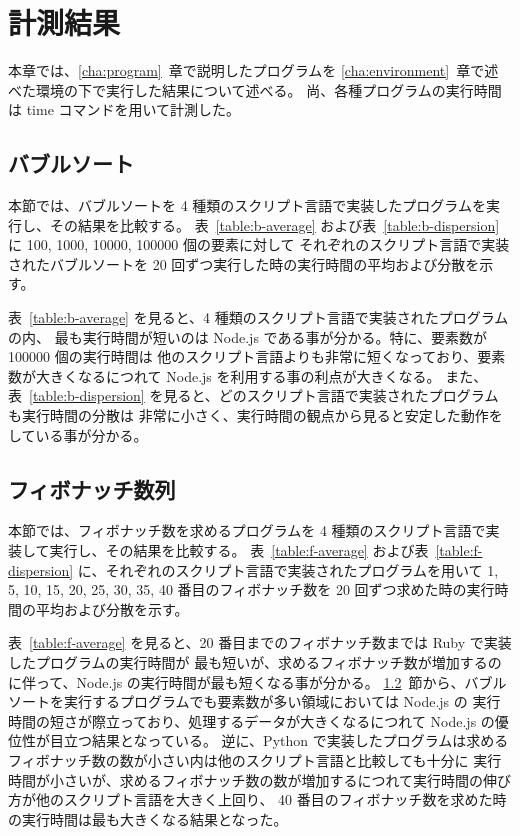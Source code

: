 \chapter{計測結果}
\label{cha:result}

本章では、\ref{cha:program}~章で説明したプログラムを \ref{cha:environment}~章で述べた環境の下で実行した結果について述べる。
尚、各種プログラムの実行時間は time コマンドを用いて計測した。

\section{バブルソート}
\label{cha:result:bubble}

本節では、バブルソートを 4 種類のスクリプト言語で実装したプログラムを実行し、その結果を比較する。
表~\ref{table:b-average} および表~\ref{table:b-dispersion} に 100, 1000, 10000, 100000 個の要素に対して
それぞれのスクリプト言語で実装されたバブルソートを 20 回ずつ実行した時の実行時間の平均および分散を示す。

表~\ref{table:b-average} を見ると、4 種類のスクリプト言語で実装されたプログラムの内、
最も実行時間が短いのは Node.js である事が分かる。特に、要素数が 100000 個の実行時間は
他のスクリプト言語よりも非常に短くなっており、要素数が大きくなるにつれて Node.js を利用する事の利点が大きくなる。
また、表~\ref{table:b-dispersion} を見ると、どのスクリプト言語で実装されたプログラムも実行時間の分散は
非常に小さく、実行時間の観点から見ると安定した動作をしている事が分かる。

\section{フィボナッチ数列}
\label{cha:result:fibonacci}

本節では、フィボナッチ数を求めるプログラムを 4 種類のスクリプト言語で実装して実行し、その結果を比較する。
表~\ref{table:f-average} および表~\ref{table:f-dispersion} に、それぞれのスクリプト言語で実装されたプログラムを用いて
1, 5, 10, 15, 20, 25, 30, 35, 40 番目のフィボナッチ数を 20 回ずつ求めた時の実行時間の平均および分散を示す。

表~\ref{table:f-average} を見ると、20 番目までのフィボナッチ数までは Ruby で実装したプログラムの実行時間が
最も短いが、求めるフィボナッチ数が増加するのに伴って、Node.js の実行時間が最も短くなる事が分かる。
\ref{cha:result:fibonacci}~節から、バブルソートを実行するプログラムでも要素数が多い領域においては Node.js の
実行時間の短さが際立っており、処理するデータが大きくなるにつれて Node.js の優位性が目立つ結果となっている。
逆に、Python で実装したプログラムは求めるフィボナッチ数の数が小さい内は他のスクリプト言語と比較しても十分に
実行時間が小さいが、求めるフィボナッチ数の数が増加するにつれて実行時間の伸び方が他のスクリプト言語を大きく上回り、
40 番目のフィボナッチ数を求めた時の実行時間は最も大きくなる結果となった。

